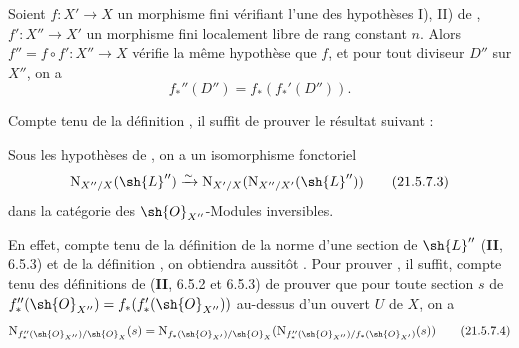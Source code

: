 \begin{proposition}[21.5.7]
\label{IV.21.5.7}
Soient $f:X'\to X$ un morphisme fini vérifiant l'une des hypothèses \textup{I), II)} de , $f':X''\to X'$ un morphisme fini localement libre de rang constant $n$.
Alors $f''=f\circ f':X''\to X$ vérifie la même hypothèse que $f$, et pour tout diviseur $D''$ sur $X''$, on a
\[
\label{IV.21.5.7.1}
  f_*''(D'')=f_*(f_*'(D'')).
  \tag{21.5.7.1}
\]
\end{proposition}

Compte tenu de la définition , il suffit de prouver le résultat suivant :

\begin{lemma}[21.5.7.2]
\label{IV.21.5.7.2}
Sous les hypothèses de , on a un isomorphisme fonctoriel
\[
\label{IV.21.5.7.3}
  \mathrm{N}_{X''/X}(\sh{L}'')\xrightarrow{\sim}\mathrm{N}_{X'/X}(\mathrm{N}_{X''/X'}(\sh{L}''))
  \tag{21.5.7.3}
\]
dans la catégorie des $\sh{O}_{X''}$-Modules inversibles.
\end{lemma}

En effet, compte tenu de la définition de la norme d'une section de $\sh{L}''$ (\textbf{II}, 6.5.3) et de la définition , on obtiendra aussitôt .
Pour prouver , il suffit, compte tenu des définitions de (\textbf{II}, 6.5.2 et 6.5.3) de prouver que pour toute section $s$ de $f_*''(\sh{O}_{X''})=f_*(f_*'(\sh{O}_{X''}))$ au-dessus d'un ouvert $U$ de $X$, on a
\[
\label{IV.21.5.7.4}
  \mathrm{N}_{f_*''(\sh{O}_{X''})/\sh{O}_X}(s)=\mathrm{N}_{f_*(\sh{O}_{X'})/\sh{O}_X}(\mathrm{N}_{f_*''(\sh{O}_{X''})/f_*(\sh{O}_{X'})}(s))
  \tag{21.5.7.4}
\]

